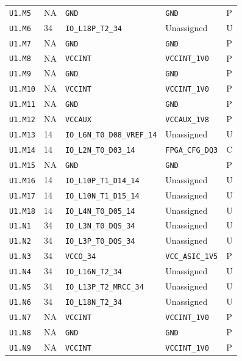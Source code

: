 \documentclass[11pt,a4paper]{article}
\begin{document}
\begin{longtable}{@{}P{20mm}P{10mm}P{75mm}P{49mm}P{7mm}@{}}
\nolinkurl{U1.M5} & NA & \nolinkurl{GND} & \nolinkurl{GND} & P \\
\nolinkurl{U1.M6} & 34 & \nolinkurl{IO_L18P_T2_34} & Unassigned & U \\
\nolinkurl{U1.M7} & NA & \nolinkurl{GND} & \nolinkurl{GND} & P \\
\nolinkurl{U1.M8} & NA & \nolinkurl{VCCINT} & \nolinkurl{VCCINT_1V0} & P \\
\nolinkurl{U1.M9} & NA & \nolinkurl{GND} & \nolinkurl{GND} & P \\
\nolinkurl{U1.M10} & NA & \nolinkurl{VCCINT} & \nolinkurl{VCCINT_1V0} & P \\
\nolinkurl{U1.M11} & NA & \nolinkurl{GND} & \nolinkurl{GND} & P \\
\nolinkurl{U1.M12} & NA & \nolinkurl{VCCAUX} & \nolinkurl{VCCAUX_1V8} & P \\
\nolinkurl{U1.M13} & 14 & \nolinkurl{IO_L6N_T0_D08_VREF_14} & Unassigned & U \\
\nolinkurl{U1.M14} & 14 & \nolinkurl{IO_L2N_T0_D03_14} & \nolinkurl{FPGA_CFG_DQ3} & C \\
\nolinkurl{U1.M15} & NA & \nolinkurl{GND} & \nolinkurl{GND} & P \\
\nolinkurl{U1.M16} & 14 & \nolinkurl{IO_L10P_T1_D14_14} & Unassigned & U \\
\nolinkurl{U1.M17} & 14 & \nolinkurl{IO_L10N_T1_D15_14} & Unassigned & U \\
\nolinkurl{U1.M18} & 14 & \nolinkurl{IO_L4N_T0_D05_14} & Unassigned & U \\
\nolinkurl{U1.N1} & 34 & \nolinkurl{IO_L3N_T0_DQS_34} & Unassigned & U \\
\nolinkurl{U1.N2} & 34 & \nolinkurl{IO_L3P_T0_DQS_34} & Unassigned & U \\
\nolinkurl{U1.N3} & 34 & \nolinkurl{VCCO_34} & \nolinkurl{VCC_ASIC_1V5} & P \\
\nolinkurl{U1.N4} & 34 & \nolinkurl{IO_L16N_T2_34} & Unassigned & U \\
\nolinkurl{U1.N5} & 34 & \nolinkurl{IO_L13P_T2_MRCC_34} & Unassigned & U \\
\nolinkurl{U1.N6} & 34 & \nolinkurl{IO_L18N_T2_34} & Unassigned & U \\
\nolinkurl{U1.N7} & NA & \nolinkurl{VCCINT} & \nolinkurl{VCCINT_1V0} & P \\
\nolinkurl{U1.N8} & NA & \nolinkurl{GND} & \nolinkurl{GND} & P \\
\nolinkurl{U1.N9} & NA & \nolinkurl{VCCINT} & \nolinkurl{VCCINT_1V0} & P \\

\end{longtable}
\end{document}
